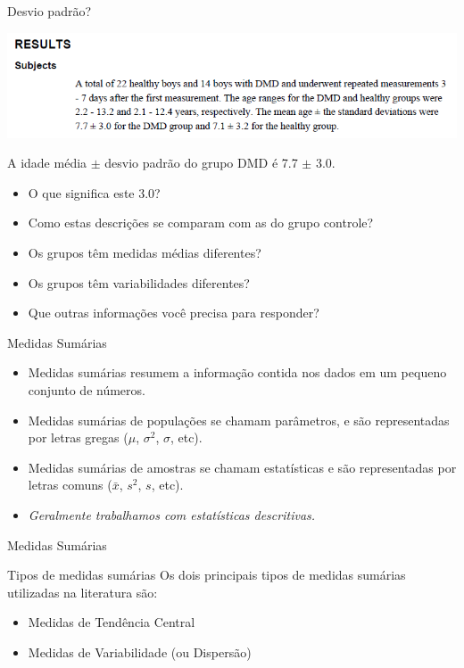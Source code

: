 \documentclass{beamer}
\begin{document}
\begin{frame}{\scriptsize Desvio padrão?}
  \begin{center}
    \includegraphics[width=1\textwidth]{Cap3/DP2}
  \end{center}

  \begin{block}{}
    \footnotesize
    A idade média $\pm$ desvio padrão do grupo DMD é 7.7 $\pm$ 3.0.

    \begin{itemize}
      \footnotesize
    \item O que significa este 3.0?
    \item Como estas descrições se comparam com as do grupo controle?
    \item \alert{Os grupos têm medidas médias diferentes?}
    \item \alert{Os grupos têm variabilidades diferentes?}
    \item Que outras informações você precisa para responder?
    \end{itemize}
  \end{block}
\end{frame}

\begin{frame}{\scriptsize Medidas Sumárias}
  \begin{itemize}
    \footnotesize
  \item Medidas sumárias resumem a informação contida nos dados em um
    pequeno conjunto de números.
  \item Medidas sumárias de \alert{populações} se chamam
    \alert{parâmetros}, e são representadas por letras gregas ($\mu$, $\sigma^2$, $\sigma$, etc).
  \item Medidas sumárias de \alert{amostras} se chamam \alert{estatísticas} e são representadas por letras comuns ($\bar{x}$, $s^2$, $s$, etc).
  \item {\em Geralmente trabalhamos com estatísticas descritivas.}
  \end{itemize}
\end{frame}

\begin{frame}{\scriptsize Medidas Sumárias}
  \begin{block}{Tipos de medidas sumárias}
    \footnotesize
    Os dois principais tipos de medidas sumárias utilizadas na literatura são:
    \begin{itemize}
    \footnotesize
    \item Medidas de Tendência Central
    \item Medidas de Variabilidade (ou Dispersão)
    \end{itemize}
  \end{block}
\end{frame}
\end{document}
